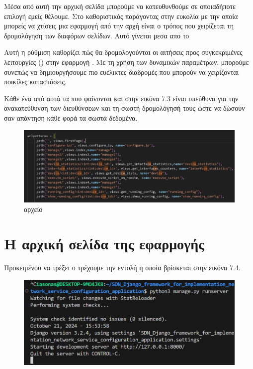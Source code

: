 \FloatBarrier

Μέσα από αυτή την αρχική σελίδα μπορούμε να κατευθυνθούμε σε οποιαδήποτε επιλογή εμείς θέλουμε.
Στο  καθοριστικός παράγοντας στην ευκολία με την οποία
μπορείς να χτίσεις μια εφαρμογή από την αρχή είναι ο τρόπος που χειρίζεται
τη δρομολόγηση των διαφόρων σελίδων. Αυτό γίνεται μεσα απο το 

Αυτή η ρύθμιση καθορίζει πώς θα δρομολογούνται οι 
αιτήσεις  προς συγκεκριμένες λειτουργίες () 
στην εφαρμογή . Με τη χρήση των δυναμικών παραμέτρων, 
μπορούμε συνεπώς να δημιουργήσουμε πιο ευέλικτες διαδρομές  
που μπορούν να χειρίζονται ποικίλες καταστάσεις. 

Κάθε ένα από αυτά τα  που φαίνονται και στην εικόνα 7.3
είναι υπεύθυνα για την ανακατεύθυνση των διευθύνσεων και τη σωστή δρομολόγησή
τους ώστε να δώσουν σαν απάντηση κάθε φορά τα σωστά δεδομένα.

\FloatBarrier
\begin{figure}[h]
	\centering
	\includegraphics[width=1.0\textwidth]{graphics/urls.png}
	\caption{  αρχείο}
\end{figure}

\FloatBarrier



\section{Η αρχική σελίδα της εφαρμογής}

Προκειμένου να τρέξει ο 
τρέχουμε την εντολή  η οποία βρίσκεται στην 
εικόνα 7.4.

\FloatBarrier

\begin{figure}[h]
	\centering
	\includegraphics[width=1.0\textwidth]{graphics/django_server_run.png}
	\caption{ }
\end{figure}


